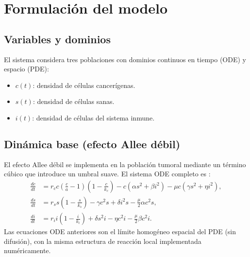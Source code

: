 \chapter{Formulación del modelo}

\section{Variables y dominios}
El sistema considera tres poblaciones con dominios continuos en tiempo (ODE) y espacio (PDE):
\begin{itemize}
  \item $c(t)$: densidad de células cancerígenas.
  \item $s(t)$: densidad de células sanas.
  \item $i(t)$: densidad de células del sistema inmune.
\end{itemize}

\section{Dinámica base (efecto Allee débil)}
El efecto Allee débil se implementa en la población tumoral mediante un término cúbico que introduce un umbral suave. El sistema ODE completo es \cite{delitala_mathematical_2007,corcoran_cancer_2020}:
\begin{align}
\frac{dc}{dt} &= r_c c \left(\frac{c}{a} - 1\right)\left(1 - \frac{c}{k_c}\right) - c(\alpha s^2 + \beta i^2) - \mu c(\gamma s^2 + \eta i^2), \label{eqn:cancer_dynamic} \\
\frac{ds}{dt} &= r_s s \left(1 - \frac{s}{k_s}\right) - \gamma c^2 s + \delta i^2 s - \frac{\mu}{2} \alpha c^2 s, \label{eqn:sano_dynamic} \\
\frac{di}{dt} &= r_i i \left(1 - \frac{i}{k_i}\right) + \delta s^2 i - \eta c^2 i - \frac{\mu}{2} \beta c^2 i. \label{eqn:inmune_dynamic}
\end{align}
Las ecuaciones ODE anteriores son el límite homogéneo espacial del PDE (sin difusión), con la misma estructura de reacción local implementada numéricamente.

